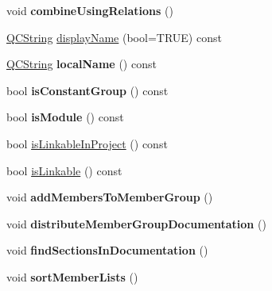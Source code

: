 \begin{DoxyCompactItemize}
\item 
\hypertarget{class_namespace_def_ae982cd945c697ac5324aa95785b23f55}{void {\bfseries combine\-Using\-Relations} ()}\label{class_namespace_def_ae982cd945c697ac5324aa95785b23f55}

\item 
\hyperlink{class_q_c_string}{Q\-C\-String} \hyperlink{class_namespace_def_a67d09f414df966d11bbeba6298307bdf}{display\-Name} (bool=T\-R\-U\-E) const 
\item 
\hypertarget{class_namespace_def_a85adac6c21b9f8e8f374c9b915f875ee}{\hyperlink{class_q_c_string}{Q\-C\-String} {\bfseries local\-Name} () const }\label{class_namespace_def_a85adac6c21b9f8e8f374c9b915f875ee}

\item 
\hypertarget{class_namespace_def_ab426995b59092748c591ba94032c02ec}{bool {\bfseries is\-Constant\-Group} () const }\label{class_namespace_def_ab426995b59092748c591ba94032c02ec}

\item 
\hypertarget{class_namespace_def_ac63aab9e66c02c1c0c46dc4aa2452e11}{bool {\bfseries is\-Module} () const }\label{class_namespace_def_ac63aab9e66c02c1c0c46dc4aa2452e11}

\item 
bool \hyperlink{class_namespace_def_a7ff00a84da6e47f3c64c6bf9f6316385}{is\-Linkable\-In\-Project} () const 
\item 
bool \hyperlink{class_namespace_def_afb5645c0dc69c2f1da67da6e33316e3b}{is\-Linkable} () const 
\item 
\hypertarget{class_namespace_def_ab9b8dfbf4b834e7f3e6557537a877ed9}{void {\bfseries add\-Members\-To\-Member\-Group} ()}\label{class_namespace_def_ab9b8dfbf4b834e7f3e6557537a877ed9}

\item 
\hypertarget{class_namespace_def_a2422e453d341daa281687fb6a4e7b76f}{void {\bfseries distribute\-Member\-Group\-Documentation} ()}\label{class_namespace_def_a2422e453d341daa281687fb6a4e7b76f}

\item 
\hypertarget{class_namespace_def_ad714b0e193e95efc23bb5de8dfb76cb6}{void {\bfseries find\-Sections\-In\-Documentation} ()}\label{class_namespace_def_ad714b0e193e95efc23bb5de8dfb76cb6}

\item 
\hypertarget{class_namespace_def_a8769ab4803a557422b86e565cb6b30d0}{void {\bfseries sort\-Member\-Lists} ()}\label{class_namespace_def_a8769ab4803a557422b86e565cb6b30d0}


\end{DoxyCompactItemize}
